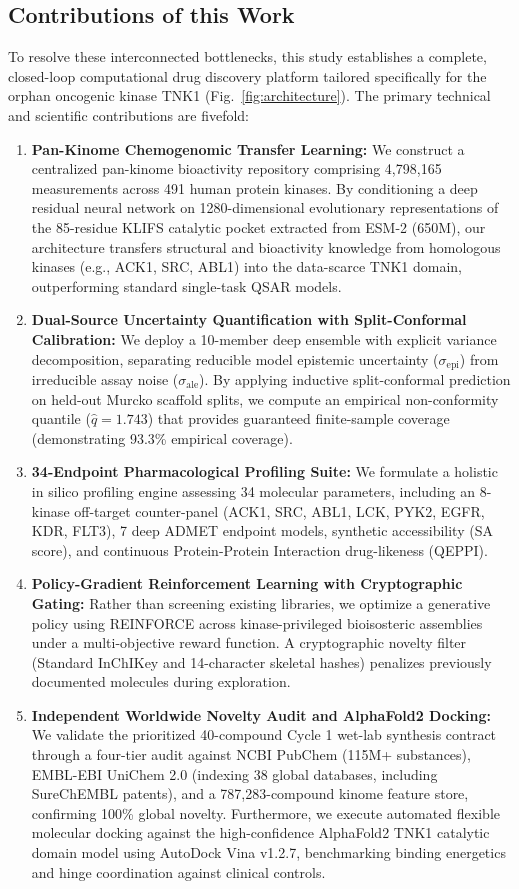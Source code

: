 \documentclass[journal]{IEEEtran}
\begin{document}
\subsection{Contributions of this Work}
To resolve these interconnected bottlenecks, this study establishes a complete, closed-loop computational drug discovery platform tailored specifically for the orphan oncogenic kinase TNK1 (Fig.~\ref{fig:architecture}). The primary technical and scientific contributions are fivefold:
\begin{enumerate}
    \item \textbf{Pan-Kinome Chemogenomic Transfer Learning:} We construct a centralized pan-kinome bioactivity repository comprising 4,798,165 measurements across 491 human protein kinases. By conditioning a deep residual neural network on 1280-dimensional evolutionary representations of the 85-residue KLIFS catalytic pocket extracted from ESM-2 (650M), our architecture transfers structural and bioactivity knowledge from homologous kinases (e.g., ACK1, SRC, ABL1) into the data-scarce TNK1 domain, outperforming standard single-task QSAR models.
    \item \textbf{Dual-Source Uncertainty Quantification with Split-Conformal Calibration:} We deploy a 10-member deep ensemble with explicit variance decomposition, separating reducible model epistemic uncertainty ($\sigma_{\text{epi}}$) from irreducible assay noise ($\sigma_{\text{ale}}$). By applying inductive split-conformal prediction on held-out Murcko scaffold splits, we compute an empirical non-conformity quantile ($\hat{q} = 1.743$) that provides guaranteed finite-sample coverage (demonstrating 93.3\% empirical coverage).
    \item \textbf{34-Endpoint Pharmacological Profiling Suite:} We formulate a holistic in silico profiling engine assessing 34 molecular parameters, including an 8-kinase off-target counter-panel (ACK1, SRC, ABL1, LCK, PYK2, EGFR, KDR, FLT3), 7 deep ADMET endpoint models, synthetic accessibility (SA score), and continuous Protein-Protein Interaction drug-likeness (QEPPI).
    \item \textbf{Policy-Gradient Reinforcement Learning with Cryptographic Gating:} Rather than screening existing libraries, we optimize a generative policy using REINFORCE across kinase-privileged bioisosteric assemblies under a multi-objective reward function. A cryptographic novelty filter (Standard InChIKey and 14-character skeletal hashes) penalizes previously documented molecules during exploration.
    \item \textbf{Independent Worldwide Novelty Audit and AlphaFold2 Docking:} We validate the prioritized 40-compound Cycle 1 wet-lab synthesis contract through a four-tier audit against NCBI PubChem (115M+ substances), EMBL-EBI UniChem 2.0 (indexing 38 global databases, including SureChEMBL patents), and a 787,283-compound kinome feature store, confirming 100\% global novelty. Furthermore, we execute automated flexible molecular docking against the high-confidence AlphaFold2 TNK1 catalytic domain model using AutoDock Vina v1.2.7, benchmarking binding energetics and hinge coordination against clinical controls.
\end{enumerate}
\end{document}
